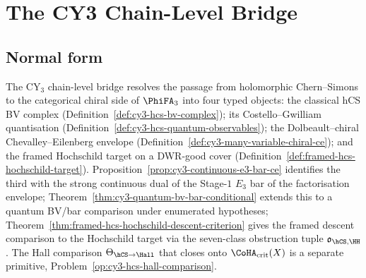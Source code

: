\chapter{The CY3 Chain-Level Bridge}
\label{ch:cy3-chain-level-bridge}

\providecommand{\Krit}{\mathrm{Krit}}
\providecommand{\DR}{\mathrm{DR}}

\section{Normal form}
\label{sec:cy3-chain-level-bridge-normal-form}

The CY$_3$ chain-level bridge resolves the passage from holomorphic
Chern--Simons to the categorical chiral side of $\PhiFA_3$ into four
typed objects: the classical hCS BV complex
\textup{(}Definition~\ref{def:cy3-hcs-bv-complex}\textup{);} its
Costello--Gwilliam quantisation
\textup{(}Definition~\ref{def:cy3-hcs-quantum-observables}\textup{);}
the Dolbeault--chiral Chevalley--Eilenberg envelope
\textup{(}Definition~\ref{def:cy3-many-variable-chiral-ce}\textup{);}
and the framed Hochschild target on a DWR-good cover
\textup{(}Definition~\ref{def:framed-hcs-hochschild-target}\textup{).}
Proposition~\ref{prop:cy3-continuous-e3-bar-ce} identifies the third with
the strong continuous dual of the Stage-$1$ $E_3$ bar of the
factorisation envelope; Theorem~\ref{thm:cy3-quantum-bv-bar-conditional}
extends this to a quantum BV/bar comparison under enumerated hypotheses;
Theorem~\ref{thm:framed-hcs-hochschild-descent-criterion} gives the
framed descent comparison to the Hochschild target via the seven-class
obstruction tuple $\mathfrak o_{\hCS,\HH}$. The Hall comparison
$\Theta_{\hCS\to\Hall}$ that closes onto $\CoHA_{\mathrm{crit}}(X)$ is a
separate primitive,
Problem~\ref{op:cy3-hcs-hall-comparison}.

